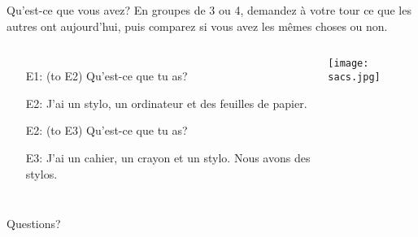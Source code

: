 \documentclass{beamer}
\begin{document}
  \begin{frame}{Qu'est-ce que vous avez? }
    \small
    En groupes de 3 ou 4, demandez à votre tour ce que les autres ont aujourd'hui, puis comparez si vous avez les mêmes choses ou non. \\
    \begin{columns}
        \begin{itemize}
          \item[E1:] (to E2) Qu'est-ce que tu as?
          \item[] 
          \item[E2:] J'ai un \alert{stylo}, un ordinateur et des feuilles de papier.
          \item[] 
          \item[E2:] (to E3) Qu'est-ce que tu as?
          \item[] 
          \item[E3:] J'ai un cahier, un crayon et un \alert{stylo}. Nous avons \alert{des stylos}.
          \item[] 
        \end{itemize}
        \begin{center}
          \texttt{[image: sacs.jpg]}
        \end{center}
    \end{columns}
  \end{frame}

  \begin{frame}{}
    \begin{center}
      \Large Questions?
    \end{center}
  \end{frame}
\end{document}
